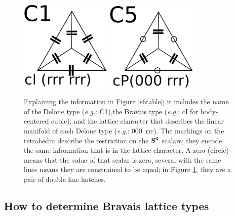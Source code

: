 \documentclass[preprint]{iucr}              %
\numberwithin{equation}{section}
\newcommand{\SVI}[0]{$\bf{S^{6}}$}
\begin{document}
	\begin{figure}
		\begin{center}
			\includegraphics[width=0.4\textwidth]{C1_square}
			\includegraphics[width=0.4\textwidth]{C5_square}
			\label{Btype}
			\caption{Explaining the information in Figure \ref{s6table}; it includes the
				name of the Delone type (\textit{e.g.}: C1),the Bravais type
				(\textit{e.g.}: cI for body-centered cubic), and the lattice character that describes
				the linear manifold of each Delone type (\textit{e.g.}: 
				\mbox{000 rrr}).
				The markings on the tetrahedra describe the restriction on the \SVI{}
				scalars; they encode the same information that is in the lattice
				character. A zero (circle) means that the value of that scalar is
				zero, several with the same lines means they are constrained to be
				equal; in Figure \ref{Btype}, they are a pair of double
				line hatches.}
			
		\end{center}
		
	\end{figure}
	
	
	
\subsection{How to determine Bravais lattice types}
			
\end{document}
